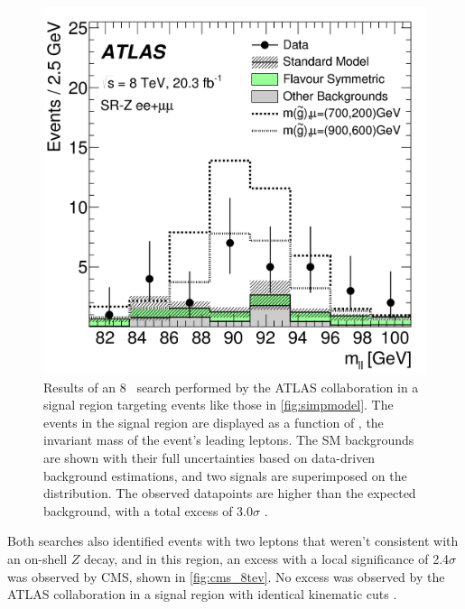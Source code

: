 \begin{centering}
\begin{figure}[!hbt]
\myfloatalign
\includegraphics[width=.9\linewidth]{figures/theory/figaux_12a.png}
\caption{ Results of an 8 \tev~search performed by the \ac{ATLAS} collaboration in a signal region targeting events like those in \autoref{fig:simpmodel}. The events in the signal region are displayed as a function of \mll, the invariant mass of the event's leading leptons. The \ac{SM} backgrounds are shown with their full uncertainties based on data-driven background estimations, and two signals are superimposed on the distribution. The observed datapoints are higher than the expected background, with a total excess of 3.0$\sigma$ \cite{SUSY-2014-10}.}
\label{fig:atlas_8tev}
\end{figure}
\end{centering}

Both searches also identified events with two leptons that weren't consistent with an on-shell $Z$ decay, and in this region, an excess with a local significance of 2.4$\sigma$ was observed by \ac{CMS}, shown in \autoref{fig:cms_8tev}. No excess was observed by the \ac{ATLAS} collaboration in a signal region with identical kinematic cuts \cite{SUSY-2014-10}. 

